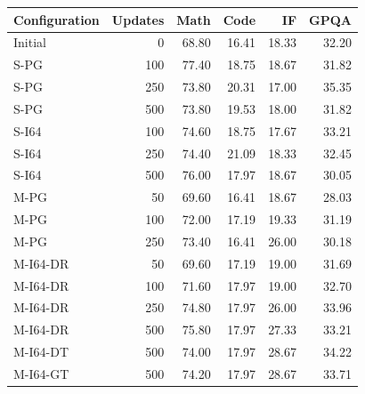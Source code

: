 \begin{tabular}{lrrrrr}
\toprule
Configuration & Updates & Math & Code & IF & GPQA \\
\midrule
Initial & 0 & 68.80 & 16.41 & 18.33 & 32.20 \\
S-PG & 100 & 77.40 & 18.75 & 18.67 & 31.82 \\
S-PG & 250 & 73.80 & 20.31 & 17.00 & 35.35 \\
S-PG & 500 & 73.80 & 19.53 & 18.00 & 31.82 \\
S-I64 & 100 & 74.60 & 18.75 & 17.67 & 33.21 \\
S-I64 & 250 & 74.40 & 21.09 & 18.33 & 32.45 \\
S-I64 & 500 & 76.00 & 17.97 & 18.67 & 30.05 \\
M-PG & 50 & 69.60 & 16.41 & 18.67 & 28.03 \\
M-PG & 100 & 72.00 & 17.19 & 19.33 & 31.19 \\
M-PG & 250 & 73.40 & 16.41 & 26.00 & 30.18 \\
M-I64-DR & 50 & 69.60 & 17.19 & 19.00 & 31.69 \\
M-I64-DR & 100 & 71.60 & 17.97 & 19.00 & 32.70 \\
M-I64-DR & 250 & 74.80 & 17.97 & 26.00 & 33.96 \\
M-I64-DR & 500 & 75.80 & 17.97 & 27.33 & 33.21 \\
M-I64-DT & 500 & 74.00 & 17.97 & 28.67 & 34.22 \\
M-I64-GT & 500 & 74.20 & 17.97 & 28.67 & 33.71 \\
\bottomrule
\end{tabular}

